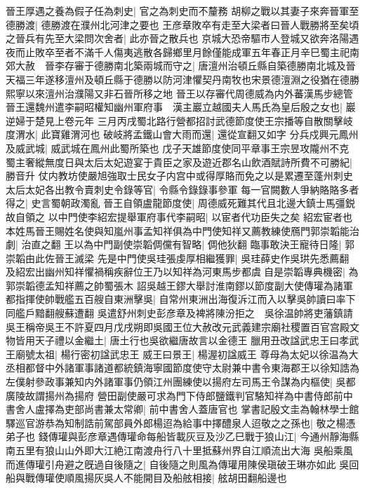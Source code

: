 晉王厚遇之養為假子任為刺史|{
	官之為刺史而不釐務}
胡柳之戰以其妻子來奔晉軍至德勝渡|{
	德勝渡在濮州北河津之要也}
王彦章敗卒有走至大梁者曰晉人戰勝將至矣頃之晉兵有先至大梁問次舍者|{
	此亦晉之散兵也}
京城大恐帝驅市人登城又欲奔洛陽遇夜而止敗卒至者不滿千人傷夷逃散各歸鄉里月餘僅能成軍五年春正月辛巳蜀主祀南郊大赦　晉李存審于德勝南北築兩城而守之|{
	唐澶州治頓丘縣自築德勝南北城及晉天福三年遂移澶州及頓丘縣于德勝以防河津懼契丹南牧也宋景德澶淵之役猶在德勝熙寧以來澶州治濮陽又非石晉所移之地}
晉王以存審代周德威為内外蕃漢馬步總管晉王還魏州遣李嗣昭權知幽州軍府事　漢主巖立越國夫人馬氏為皇后殷之女也|{
	巖逆婦于楚見上卷元年}
三月丙戌蜀北路行營都招討武德節度使王宗播等自散關擊岐度渭水|{
	此寶雞渭河也}
破岐將孟鐵山會大雨而還|{
	還從宣翻又如字}
分兵戍興元鳳州及威武城|{
	威武城在鳳州此蜀所築也}
戊子天雄節度使同平章事王宗昱攻隴州不克　蜀主奢縱無度日與太后太妃遊宴于貴臣之家及遊近郡名山飲酒賦詩所費不可勝紀|{
	勝音升}
仗内教坊使嚴旭強取士民女子内宫中或得厚賂而免之以是累遷至蓬州刺史太后太妃各出教令賣刺史令錄等官|{
	令縣令錄錄事參軍}
每一官闕數人爭納賂賂多者得之|{
	史言蜀朝政濁亂}
晉王自領盧龍節度使|{
	周德威死難其代且北邊大鎮士馬彊鋭故自領之}
以中門使李紹宏提舉軍府事代李嗣昭|{
	以宦者代功臣失之矣}
紹宏宦者也本姓馬晉王賜姓名使與知嵐州事孟知祥俱為中門使知祥又薦教練使鴈門郭崇韜能治劇|{
	治直之翻}
王以為中門副使崇韜倜儻有智略|{
	倜他狄翻}
臨事敢決王寵待日隆|{
	郭崇韜由此佐晉王滅梁}
先是中門使吳珪張虔厚相繼獲罪|{
	吳珪薛史作吳珙先悉薦翻}
及紹宏出幽州知祥懼禍稱疾辭位王乃以知祥為河東馬步都虞自是崇韜專典機密|{
	為郭崇韜德孟知祥薦之帥蜀張木}
詔吳越王鏐大舉討淮南鏐以節度副大使傳瓘為諸軍都指揮使帥戰艦五百艘自東洲擊吳|{
	自常州東洲出海復泝江而入以擊吳帥讀曰率下同艦戶黯翻艘蘇遭翻}
吳遣舒州刺史彭彦章及裨將陳汾拒之　吳徐温帥將吏藩鎮請吳王稱帝吳王不許夏四月戊戌朔即吳國王位大赦改元武義建宗廟社稷置百官宫殿文物皆用天子禮以金繼土|{
	唐土行也吳欲繼唐故言以金德王}
臘用丑改諡武忠王曰孝武王廟號太祖|{
	楊行密初諡武忠王}
威王曰景王|{
	楊渥初諡威王}
尊母為太妃以徐温為大丞相都督中外諸軍事諸道都統鎮海寧國節度使守太尉兼中書令東海郡王以徐知誥為左僕射參政事兼知内外諸軍事仍領江州團練使以揚府左司馬王令謀為内樞使|{
	吳都廣陵故謂揚州為揚府}
營田副使嚴可求為門下侍郎鹽鐵判官駱知祥為中書侍郎前中書舍人盧擇為吏部尚書兼太常卿|{
	前中書舍人蓋唐官也}
掌書記殷文圭為翰林學士館驛巡官游恭為知制誥前駕部員外郎楊迢為給事中擇醴泉人迢敬之之孫也|{
	敬之楊憑弟子也}
錢傳瓘與彭彦章遇傳瓘命每船皆載灰豆及沙乙巳戰于狼山江|{
	今通州靜海縣南五里有狼山山外即大江絶江南渡舟行八十里抵蘇州界自江順流出大海}
吳船乘風而進傳瓘引舟避之旣過自後隨之|{
	自後隨之則風為傳瓘用陳侯瑱破王琳亦如此}
吳回船與戰傳瓘使順風揚灰吳人不能開目及船舷相接|{
	舷胡田翻船邊也}
